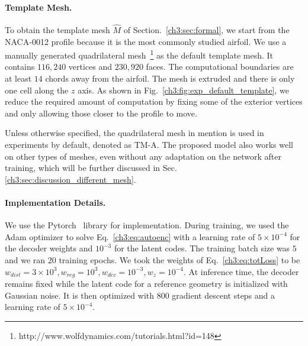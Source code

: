 \paragraph{Template Mesh.}
%
To obtain the template mesh $\hat{M}$ of Section.~\ref{ch3:sec:formal}, we start from the NACA-0012 profile because it is the most commonly studied airfoil. We use a manually generated quadrilateral mesh~\footnote{http://www.wolfdynamics.com/tutorials.html?id=148} as the default template mesh. It contains $116,240$ vertices and $230,920$ faces. The computational boundaries are at least $14$ chords away from the airfoil. The mesh is extruded and there is only one cell along the $z$ axis. As shown in Fig.~\ref{ch3:fig:exp_default_template}, we reduce the required amount of computation by fixing some of the exterior vertices and only allowing those closer to the profile to move.

Unless otherwise specified, the quadrilateral mesh in mention is used in experiments by default, denoted as TM-A. The proposed model also works well on other types of meshes, even without any adaptation on the network after training, which will be further discussed in Sec.\ref{ch3:sec:discussion_different_mesh}.

\paragraph{Implementation Details.}

We use the Pytorch~\cite{ai.Paszke2019} library for implementation. During training, we used the Adam optimizer \cite{ai.Kingma2015b} to solve Eq.~\ref{ch3:eq:autoenc} with a learning rate of $5\times 10^{-4}$ for the decoder weights and $10^{-3}$ for the latent codes. The training batch size was $5$ and we ran $20$ training epochs. We took the weights of Eq.~\ref{ch3:eq:totLoss} to be $w_{dist}=3\times 10^3, w_{reg}=10^3, w_{dec} = 10^{-3}, w_{z}=10^{-4}$.
At inference time, the decoder remains fixed while the latent code for a reference geometry is initialized with Gaussian noise. It is then optimized with $800$ gradient descent steps and a learning rate of $5\times 10^{-4}$.